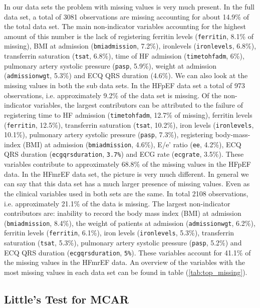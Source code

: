 \documentclass[../thesis.tex]{subfiles}
\begin{document}


\indent In our data sets the problem with missing values is very much present. In the full data set, a total of 3081 observations are missing accounting for about 14.9\% of the total data set. The main non-indicator variables accounting for the highest amount of this number is the lack of registering ferritin levels (\texttt{ferritin}, 8.1\% of missing), BMI at admission (\texttt{bmiadmission}, 7.2\%), ironlevels (\texttt{ironlevels}, 6.8\%), transferrin saturation (\texttt{tsat}, 6.8\%), time of HF admission (\texttt{timetohfadm}, 6\%), pulmonary artery systolic pressure (\texttt{pasp}, 5.9\%), weight at admission (\texttt{admissionwgt}, 5.3\%) and ECQ QRS duration (4.6\%). We can also look at the missing values in both the sub data sets. In the HFpEF data set a total of 973 observations, i.e. approximately 9.2\% of the data set is missing. Of the non-indicator variables, the largest contributors can be attributed to the failure of registering time to HF admission (\texttt{timetohfadm}, 12.7\% of missing), ferritin levels (\texttt{ferritin}, 12.5\%), transferrin saturation (\texttt{tsat}, 10.2\%), iron levels (\texttt{ironlevels}, 10.1\%), pulmonary artery systolic pressure (\texttt{pasp}, 7.3\%), registering body-mass-index (BMI) at admission (\texttt{bmiadmission}, 4.6\%), E/e' ratio (\texttt{ee}, 4.2\%), ECQ QRS duration (\texttt{ecgqrsduration}, \texttt{3.7\%}) and ECG rate (\texttt{ecgrate}, 3.5\%). These variables contribute to approximately 68.8\% of the missing values in the HFpEF data. In the HFmrEF data set, the picture is very much different. In general we can say that this data set has a much larger presence of missing values. Even as the clinical variables used in both sets are the same. In total 2108 observations, i.e. approximately 21.1\% of the data is missing. The largest non-indicator contributors are: inability to record the body mass index (BMI) at admission (\texttt{bmiadmission}, 8.4\%), the weight of patients at admission (\texttt{admissionwgt}, 6.2\%), ferritin levels (\texttt{ferritin}, 6.1\%), iron levels (\texttt{ironlevels}, 5.3\%), transferrin saturation (\texttt{tsat}, 5.3\%), pulmonary artery systolic pressure (\texttt{pasp}, 5.2\%) and ECQ QRS duration (\texttt{ecgqrsduration}, \texttt{5\%}). These variables account for 41.1\% of the missing values in the HFmrEF data. An overview of the variables with the most missing values in each data set can be found in table (\ref{tab:top_missing}).

\subsection{Little's Test for MCAR}
\label{subsec:little}
\end{document}
